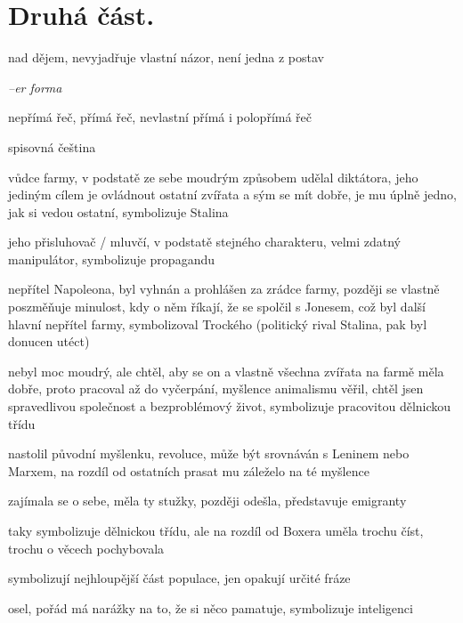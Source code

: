 \documentclass{article}
\begin{document}
\section{Druhá část.}
\begin{description}
    \setlength\itemsep{0.15em}
    \item[vypravěč:] nad dějem, nevyjadřuje vlastní názor, není jedna z postav
    \item[vyprávěcí způsoby:] \textit{--er forma}
    \item[typy promluv:] nepřímá řeč, přímá řeč, nevlastní přímá i polopřímá řeč
    \item[jazyková stránka:] spisovná čeština
    \item[postavy:]
        \begin{description}
            \setlength\itemsep{0.15em}
 			      \item[Napoleon,] vůdce farmy, v podstatě ze sebe moudrým způsobem udělal diktátora, jeho jediným cílem je ovládnout ostatní zvířata a sým se mít dobře, je mu úplně jedno, jak si vedou ostatní, symbolizuje Stalina
   	        \item[Pištík,] jeho přisluhovač / mluvčí, v podstatě stejného charakteru, velmi zdatný manipulátor, symbolizuje propagandu
           	\item[Kuliš,] nepřítel Napoleona, byl vyhnán a prohlášen za zrádce farmy, později se vlastně poszměňuje minulost, kdy o něm
            říkají, že se spolčil s Jonesem, což byl další hlavní nepřítel farmy, symbolizoval Trockého (politický rival Stalina, pak byl donucen utéct)
           	\item[Boxer,] nebyl moc moudrý, ale chtěl, aby se on a vlastně všechna zvířata na farmě měla dobře, proto pracoval až do vyčerpání, myšlence animalismu věřil, chtěl jsen spravedlivou společnost a bezproblémový život, symbolizuje pracovitou dělnickou třídu
            \item[Major,] nastolil původní myšlenku,  revoluce, může být srovnáván s Leninem nebo Marxem, na rozdíl od ostatních prasat mu záleželo na té myšlence
            \item[Molina,] zajímala se o sebe, měla ty stužky, později odešla, představuje emigranty
            \item[Lupina,] taky symbolizuje dělnickou třídu, ale na rozdíl od Boxera uměla trochu číst, trochu o věcech pochybovala
            \item[ovce] symbolizují nejhloupější část populace, jen opakují určité fráze
            \item[Benjamin,] osel, pořád má narážky na to, že si něco pamatuje, symbolizuje inteligenci

\end{description}
\end{description}
\end{document}
